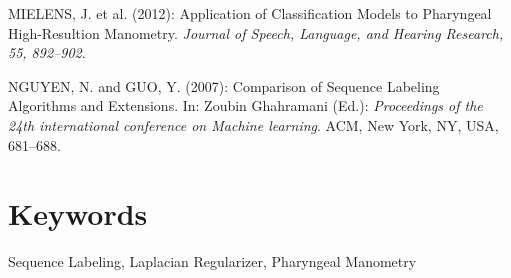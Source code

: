 \documentclass{svmult}
\begin{document}
\begin{thebibliography}{1}

\item[]
MIELENS, J. et al. (2012): Application of Classification Models to Pharyngeal High-Resultion Manometry. {\em Journal of Speech, Language, and Hearing Research, 55, 892--902}.

\item[]
NGUYEN, N. and GUO, Y. (2007): Comparison of Sequence Labeling Algorithms and Extensions. In: Zoubin Ghahramani (Ed.): {\em Proceedings of the 24th international conference on Machine learning}. ACM, New York, NY, USA, 681--688.

\end{thebibliography}

\section*{Keywords}
Sequence Labeling, Laplacian Regularizer, Pharyngeal Manometry
\end{document}
